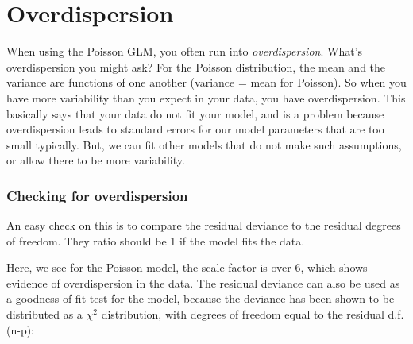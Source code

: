 \documentclass[
  letterpaper,
  DIV=11,
  numbers=noendperiod]{scrreprt}
\newenvironment{Shaded}{\begin{snugshade}}{\end{snugshade}}
\newcommand{\AttributeTok}[1]{\textcolor[rgb]{0.40,0.45,0.13}{#1}}
\newcommand{\DecValTok}[1]{\textcolor[rgb]{0.68,0.00,0.00}{#1}}
\newcommand{\FunctionTok}[1]{\textcolor[rgb]{0.28,0.35,0.67}{#1}}
\newcommand{\NormalTok}[1]{\textcolor[rgb]{0.00,0.23,0.31}{#1}}
\newcommand{\OtherTok}[1]{\textcolor[rgb]{0.00,0.23,0.31}{#1}}
\newcommand{\SpecialCharTok}[1]{\textcolor[rgb]{0.37,0.37,0.37}{#1}}
\begin{document}
\hypertarget{overdispersion}{%
\section{Overdispersion}\label{overdispersion}}

When using the Poisson GLM, you often run into \emph{overdispersion}.
What's overdispersion you might ask? For the Poisson distribution, the
mean and the variance are functions of one another (variance = mean for
Poisson). So when you have more variability than you expect in your
data, you have overdispersion. This basically says that your data do not
fit your model, and is a problem because overdispersion leads to
standard errors for our model parameters that are too small typically.
But, we can fit other models that do not make such assumptions, or allow
there to be more variability.

\hypertarget{checking-for-overdispersion}{%
\subsubsection{Checking for
overdispersion}\label{checking-for-overdispersion}}

An easy check on this is to compare the residual deviance to the
residual degrees of freedom. They ratio should be 1 if the model fits
the data.

\begin{Shaded}
\end{Shaded}

Here, we see for the Poisson model, the scale factor is over 6, which
shows evidence of overdispersion in the data. The residual deviance can
also be used as a goodness of fit test for the model, because the
deviance has been shown to be distributed as a \(\chi^2\) distribution,
with degrees of freedom equal to the residual d.f. (n-p):

\begin{Shaded}
\end{Shaded}
\end{document}
